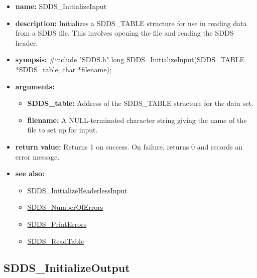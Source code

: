 \documentclass[11pt]{article}
\newcommand{\progref}[1]{\hyperref{SDDS_#1}{{\tt SDDS\_#1} (}{)}{SDDS_#1}}
\begin{document}
\begin{itemize}
\item {\bf name:}\newline
SDDS\_InitializeInput
\item {\bf description:}\newline
Initializes a SDDS\_TABLE structure for use in reading data from a SDDS file. This involves opening the file and reading the SDDS header.
\item {\bf synopsis:} \#include "SDDS.h"\newline
long SDDS\_InitializeInput(SDDS\_TABLE *SDDS\_table, char *filename);
\item {\bf arguments:}
\begin{itemize}
\item {\bf SDDS\_table:} Address of the SDDS\_TABLE structure for the data set.
\item {\bf filename:} A NULL-terminated character string giving the name of the file to set up for input.
\end{itemize}
\item {\bf return value:}\newline
Returns 1 on success. On failure, returns 0 and records an error message.
\item {\bf see also:}
\begin{itemize}
\item \progref{InitializeHeaderlessInput}
\item \progref{NumberOfErrors}
\item \progref{PrintErrors}
\item \progref{ReadTable}
\end{itemize}
\end{itemize}

\subsection{SDDS\_InitializeOutput}
\label{SDDS_InitializeOutput}
\end{document}
